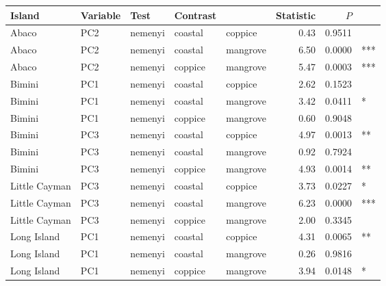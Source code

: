 
\begin{tabular}{lllllrrl}
\toprule
Island & Variable & Test & Contrast &  & Statistic & $P$ & \\
\midrule
Abaco & PC2 & nemenyi & coastal & coppice & 0.43 & 0.9511 & \\
Abaco & PC2 & nemenyi & coastal & mangrove & 6.50 & 0.0000 & ***\\
Abaco & PC2 & nemenyi & coppice & mangrove & 5.47 & 0.0003 & ***\\
Bimini & PC1 & nemenyi & coastal & coppice & 2.62 & 0.1523 & \\
Bimini & PC1 & nemenyi & coastal & mangrove & 3.42 & 0.0411 & *\\
Bimini & PC1 & nemenyi & coppice & mangrove & 0.60 & 0.9048 & \\
Bimini & PC3 & nemenyi & coastal & coppice & 4.97 & 0.0013 & **\\
Bimini & PC3 & nemenyi & coastal & mangrove & 0.92 & 0.7924 & \\
Bimini & PC3 & nemenyi & coppice & mangrove & 4.93 & 0.0014 & **\\
Little Cayman & PC3 & nemenyi & coastal & coppice & 3.73 & 0.0227 & *\\
Little Cayman & PC3 & nemenyi & coastal & mangrove & 6.23 & 0.0000 & ***\\
Little Cayman & PC3 & nemenyi & coppice & mangrove & 2.00 & 0.3345 & \\
Long Island & PC1 & nemenyi & coastal & coppice & 4.31 & 0.0065 & **\\
Long Island & PC1 & nemenyi & coastal & mangrove & 0.26 & 0.9816 & \\
Long Island & PC1 & nemenyi & coppice & mangrove & 3.94 & 0.0148 & *\\
\bottomrule
\end{tabular}
